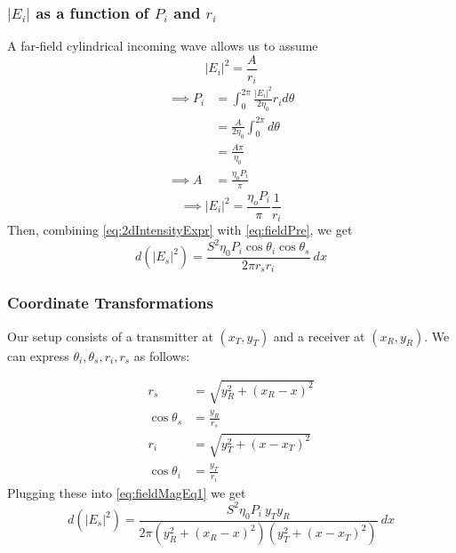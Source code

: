 \documentclass{article}
\begin{document}
\subsubsection*{$|E_i|$ as a function of $P_i$ and $r_i$}
A far-field cylindrical incoming wave allows us to assume 
\begin{equation}
   |E_i|^2 = \frac{A}{r_i}
   \label{eq:farField2d}
\end{equation}
\begin{align*}
   \implies P_i &= \int_0^{2 \pi} \frac{|E_i|^2}{2 \eta_0} r_i d \theta \\
   &= \frac{A}{2 \eta_0} \int_0^{2 \pi} d \theta \\ 
   &= \frac{A \pi}{\eta_0} \\
   \implies A &= \frac{\eta_0 P_i}{\pi}
\end{align*}
\begin{equation}
   \implies |E_i|^2 = \frac{\eta_o P_i}{\pi} \frac{1}{r_i}
   \label{eq:2dIntensityExpr}
\end{equation}
Then, combining \eqref{eq:2dIntensityExpr} with \eqref{eq:fieldPre}, we get
\begin{equation}
   d(|E_s|^2) = \frac{S^2 \eta_0 P_i \cos \theta_i \cos \theta_s }{2 \pi r_s r_i} \ dx
   \label{eq:fieldMagEq1}
\end{equation}

\subsubsection*{Coordinate Transformations}
Our setup consists of a transmitter at $(x_T, y_T)$ and a receiver at 
$(x_R, y_R)$. We can express $\theta_i, \theta_s, r_i, r_s$ as follows:

\begin{align*}
   r_s &= \sqrt{y_R^2 + (x_R - x)^2} \\
   \cos \theta_s &= \frac{y_R}{r_s} \\
   r_i &= \sqrt{y_T^2 + (x - x_T)^2} \\
   \cos \theta_i &= \frac{y_T}{r_i}
\end{align*}
Plugging these into \eqref{eq:fieldMagEq1} we get
\begin{equation}
   d(|E_s|^2) = \frac{S^2 \eta_0 P_i \ y_T y_R }{2 \pi (y_R^2 + (x_R - x)^2) ( y_T^2 + (x -
   x_T)^2)} \ dx
   \label{eq:localScaPow2dSetupParam}
\end{equation}
\newpage
   
\end{document}

